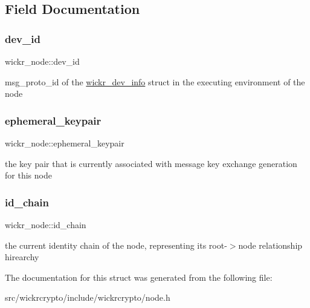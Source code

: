 \subsection{Field Documentation}
\mbox{\label{structwickr__node_a564e42fc1d4b63353d74e5fbf0bead82}} 
\subsubsection{\texorpdfstring{dev\_id}{dev\_id}}
{\footnotesize\ttfamily wickr\+\_\+node\+::dev\+\_\+id}

msg\+\_\+proto\+\_\+id of the \textquotesingle{}\mbox{\hyperlink{structwickr__dev__info}{wickr\+\_\+dev\+\_\+info}}\textquotesingle{} struct in the executing environment of the node \mbox{\label{structwickr__node_a628b61eed5cb17b831ff687143393b93}} 
\subsubsection{\texorpdfstring{ephemeral\_keypair}{ephemeral\_keypair}}
{\footnotesize\ttfamily wickr\+\_\+node\+::ephemeral\+\_\+keypair}

the key pair that is currently associated with message key exchange generation for this node \mbox{\label{structwickr__node_a3a5100ed26ae534e2070623713aacfde}} 
\subsubsection{\texorpdfstring{id\_chain}{id\_chain}}
{\footnotesize\ttfamily wickr\+\_\+node\+::id\+\_\+chain}

the current identity chain of the node, representing its root-\/$>$node relationship hirearchy 

The documentation for this struct was generated from the following file\+:\begin{DoxyCompactItemize}
\item 
src/wickrcrypto/include/wickrcrypto/node.\+h\end{DoxyCompactItemize}
